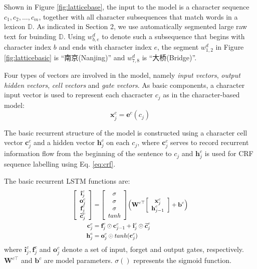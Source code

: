 \documentclass[11pt,a4paper]{article}
\newcommand*{\Scale}[2][4]{\scalebox{#1}{$#2$}}
\begin{document}
\begin{CJK*}{UTF8}{gbsn}
Shown in Figure \ref{fig:latticebase}, the input to the model is a character sequence $c_1,c_2,\ldots,c_m$, together with all character subsequences that match words in a lexicon $\mathbb{D}$. As indicated in Section 2, we use automatically segmented large raw text for buinding $\mathbb{D}$. Using $w^d_{b,e}$ to denote such a subsequence that begins with character index $b$ and ends with character index $e$, the segment $w^d_{1, 2}$ in Figure \ref{fig:latticebasic} is ``南京\;(Nanjing)'' and $w^d_{7,8}$ is ``大桥\;(Bridge)''. 

Four types of vectors are involved  in the model, namely \textit{input vectors}, \textit{output hidden vectors}, \textit{cell vectors} and \textit{gate vectors}. As basic components, a character input vector is used to represent each chacracter $c_j$ as in the character-based model:
\begin{equation}
\textbf{x}^c_j = \textbf{e}^c(c_j)
\end{equation}

The basic recurrent structure of the model is constructed using a character cell vector $\textbf{c}^c_j$ and a hidden vector $\textbf{h}_j^c$ on each $c_j$, where $\textbf{c}^c_j$ serves to record recurrent information flow from the beginning of the sentence to $c_j$ and $\textbf{h}_j^c$ is used for CRF sequence labelling using Eq. \ref{eq:crf}. 

The basic recurrent LSTM functions are: \\
\begin{equation}\label{eq:clstm}
\Scale[0.87]{
\begin{aligned}
{\left[ \begin{array}{c}
\textbf{i}_j^c \\
\textbf{o}_j^c\\
\textbf{f}_j^c\\
\boldsymbol{\widetilde{c}}_j^c
\end{array} 
\right ]} 
&=
{\left[ \begin{array}{c}
\sigma \\
\sigma\\
\sigma\\
tanh 
\end{array} 
\right ]} 
\Big(
\textbf{W}^{c\top}
{\left[ \begin{array}{c}
\textbf{x}_j^c \\
\textbf{h}_{j-1}^c\\ 
\end{array} 
\right ]} 
 +
\textbf{b}^c
 \Big)
\\
\textbf{c}_j^c &= \textbf{f}_j^c\odot \textbf{c}_{j-1}^c + \textbf{i}_j^c \odot \boldsymbol{\widetilde{c}}_j^c \\
\textbf{h}_j^c &= \textbf{o}_j^c\odot tanh(\textbf{c}_j^c) \\
\end{aligned}
}
\end{equation}
where $\textbf{i}_j^c, \textbf{f}_j^c$ and $\textbf{o}_j^c$ denote a set of input, forget and output gates, respectively. $\textbf{W}^{c\top}$ and $\textbf{b}^c$ are model parameters. $\sigma()$ represents the sigmoid function.


\end{CJK*}
\end{document}
